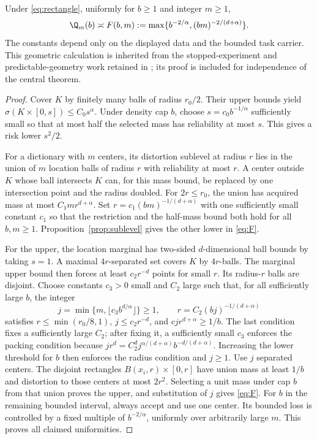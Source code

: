 \begin{proposition}\label{prop:regular}
Under \eqref{eq:rectangle}, uniformly for $b\ge1$ and integer $m\ge1$,
\begin{equation}\label{eq:F}
 \Q_m(b)\asymp F(b,m):=
 \max\{b^{-2/\alpha},(bm)^{-2/(d+\alpha)}\}.
\end{equation}
The constants depend only on the displayed data and the bounded task carrier. This geometric calculation is inherited from the stopped-experiment and predictable-geometry work retained in \cite{Companion}; its proof is included for independence of the central theorem.
\end{proposition}
\begin{proof}
Cover $K$ by finitely many balls of radius $r_0/2$. Their upper bounds yield $\sigma(K\times[0,s])\le C_0s^\alpha$. Under density cap $b$, choose $s=c_0b^{-1/\alpha}$ sufficiently small so that at most half the selected mass has reliability at most $s$. This gives a risk lower $s^2/2$.

For a dictionary with $m$ centers, its distortion sublevel at radius $r$ lies in the union of $m$ location balls of radius $r$ with reliability at most $r$. A center outside $K$ whose ball intersects $K$ can, for this mass bound, be replaced by one intersection point and the radius doubled. For $2r\le r_0$, the union has acquired mass at most $C_1m r^{d+\alpha}$. Set $r=c_1(bm)^{-1/(d+\alpha)}$ with one sufficiently small constant $c_1$ so that the restriction and the half-mass bound both hold for all $b,m\ge1$. Proposition~\ref{prop:sublevel} gives the other lower in \eqref{eq:F}.

For the upper, the location marginal has two-sided $d$-dimensional ball bounds by taking $s=1$. A maximal $4r$-separated set covers $K$ by $4r$-balls. The marginal upper bound then forces at least $c_2r^{-d}$ points for small $r$. Its radius-$r$ balls are disjoint. Choose constants $c_3>0$ small and $C_2$ large such that, for all sufficiently large $b$, the integer
\[
 j=\min\{m,\lfloor c_3b^{d/\alpha}\rfloor\}\ge1,
 \qquad r=C_2(bj)^{-1/(d+\alpha)}
\]
satisfies $r\le\min(r_0/8,1)$, $j\le c_2r^{-d}$, and $cj r^{d+\alpha}\ge1/b$. The last condition fixes a sufficiently large $C_2$; after fixing it, a sufficiently small $c_3$ enforces the packing condition because
$j r^d=C_2^d j^{\alpha/(d+\alpha)}b^{-d/(d+\alpha)}$.
Increasing the lower threshold for $b$ then enforces the radius condition and $j\ge1$. Use $j$ separated centers. The disjoint rectangles $B(x_i,r)\times[0,r]$ have union mass at least $1/b$ and distortion to those centers at most $2r^2$. Selecting a unit mass under cap $b$ from that union proves the upper, and substitution of $j$ gives \eqref{eq:F}. For $b$ in the remaining bounded interval, always accept and use one center. Its bounded loss is controlled by a fixed multiple of $b^{-2/\alpha}$, uniformly over arbitrarily large $m$. This proves all claimed uniformities.
\end{proof}

